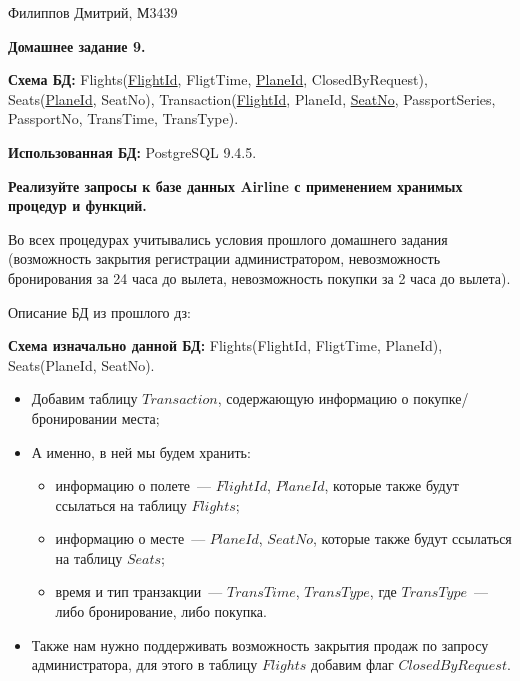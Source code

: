 \documentclass[11pt,a4paper,oneside]{article}
\begin{document}
\renewcommand{\t}[1]{\mbox{\texttt{#1}}}
\newcommand{\s}[1]{\mbox{``\t{#1}''}}
\newcommand{\eps}{\varepsilon}
\renewcommand{\phi}{\varphi}
\newcommand{\plainhat}{{\char 94}}

\newcommand{\Z}{\mathbb{Z}}
\newcommand{\w}[1]{``\t{#1}''}




Филиппов Дмитрий, М3439
\newline

\begin{LARGE} \textbf{Домашнее задание 9.} \end{LARGE}
\newline

\textbf{Схема БД:} Flights(\underline{FlightId}, FligtTime, \underline{PlaneId}, ClosedByRequest), Seats(\underline{PlaneId}, SeatNo), Transaction(\underline{FlightId}, PlaneId, \underline{SeatNo}, PassportSeries, PassportNo, TransTime, TransType).

\textbf{Использованная БД:} PostgreSQL 9.4.5.
\newline

\textbf{Реализуйте запросы к базе данных Airline с применением хранимых процедур и функций.}

Во всех процедурах учитывались условия прошлого домашнего задания (возможность закрытия регистрации администратором, невозможность бронирования за 24 часа до вылета, невозможность покупки за 2 часа до вылета).

Описание БД из прошлого дз:

\textbf{Схема изначально данной БД:} Flights(FlightId, FligtTime, PlaneId), Seats(PlaneId, SeatNo).

\begin{itemize}
  \item Добавим таблицу $Transaction$, содержающую информацию о покупке/бронировании места;
  \item А именно, в ней мы будем хранить:
    \begin{itemize}
      \item информацию о полете~--- $FlightId$, $PlaneId$, которые также будут ссылаться на таблицу $Flights$;
      \item информацию о месте~--- $PlaneId$, $SeatNo$, которые также будут ссылаться на таблицу $Seats$;
      \item время и тип транзакции~--- $TransTime$, $TransType$, где $TransType$~--- либо бронирование, либо покупка.
    \end{itemize}
  \item Также нам нужно поддерживать возможность закрытия продаж по запросу администратора, для этого в таблицу $Flights$ добавим флаг
        $ClosedByRequest$.
\end{itemize}
\end{document}
